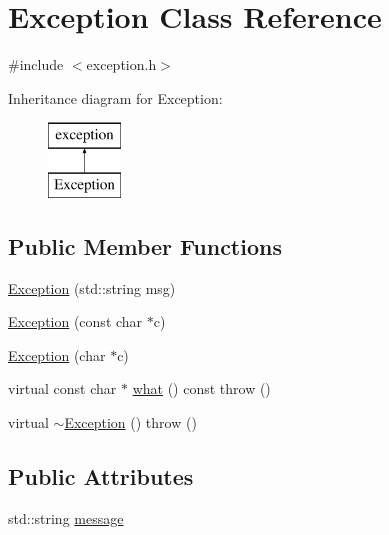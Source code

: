\hypertarget{class_exception}{\section{Exception Class Reference}
\label{class_exception}
}


{\ttfamily \#include $<$exception.\+h$>$}

Inheritance diagram for Exception\+:\begin{figure}[H]
\begin{center}
\leavevmode
\includegraphics[height=2.000000cm]{class_exception}
\end{center}
\end{figure}
\subsection*{Public Member Functions}
\begin{DoxyCompactItemize}
\item 
\hyperlink{class_exception_a8f1884d73239c76f1a5ab4a4daa43ff1}{Exception} (std\+::string msg)
\item 
\hyperlink{class_exception_ad58328e3ace476630f34b47620e9846c}{Exception} (const char $\ast$c)
\item 
\hyperlink{class_exception_a60135107dc6351685a59a3e9b0aa005f}{Exception} (char $\ast$c)
\item 
virtual const char $\ast$ \hyperlink{class_exception_a78154a31544a609cbd226d32574f52cd}{what} () const   throw ()
\item 
virtual \hyperlink{class_exception_ad1ba411de295ef2eeb02ba26284a829a}{$\sim$\+Exception} ()  throw ()
\end{DoxyCompactItemize}
\subsection*{Public Attributes}
\begin{DoxyCompactItemize}
\item 
std\+::string \hyperlink{class_exception_a80bf622a8fc3c48fa6ab1a3fc024ff91}{message}
\end{DoxyCompactItemize}


